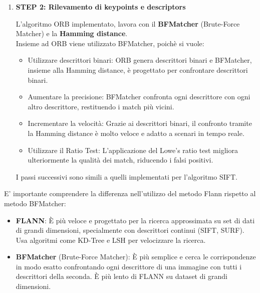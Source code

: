\documentclass[12pt,a4paper,openright,twoside]{book}
\begin{document}
\begin{enumerate}
\begin{enumerate}
{\itshape orb = cv2.ORB\_create()}\\

\item \textbf{STEP 2: Rilevamento di keypoints e descriptors}

\begin{figure}[H]
    \centering
    
\end{figure}

L'algoritmo ORB implementato, lavora con il \textbf{BFMatcher} (Brute-Force Matcher) e la \textbf{Hamming distance}.\\
Insieme ad ORB viene utilizzato BFMatcher, poichè si vuole:
\begin{itemize}
\item Utilizzare descrittori binari: ORB genera descrittori binari e BFMatcher, insieme alla Hamming distance, è progettato per confrontare descrittori binari.
\item Aumentare la precisione: BFMatcher confronta ogni descrittore con ogni altro descrittore, restituendo i match più vicini.
\item Incrementare la velocità: Grazie ai descrittori binari, il confronto tramite la Hamming distance è molto veloce e adatto a scenari in tempo reale.
\item Utilizzare il Ratio Test: L'applicazione del Lowe's ratio test migliora ulteriormente la qualità dei match, riducendo i falsi positivi.
\end{itemize}

I passi successivi sono simili a quelli implementati per l'algoritmo SIFT.
\end{enumerate}

\end{enumerate}
E' importante comprendere la differenza nell'utilizzo del metodo Flann rispetto al metodo BFMatcher:
\begin{itemize}

\item \textbf{FLANN}: È più veloce e progettato per la ricerca approssimata su set di dati di grandi dimensioni, specialmente con descrittori continui (SIFT, SURF). Usa algoritmi come KD-Tree e LSH per velocizzare la ricerca.
\item \textbf{BFMatcher} (Brute-Force Matcher): È più semplice e cerca le corrispondenze in modo esatto confrontando ogni descrittore di una immagine con tutti i descrittori della seconda. È più lento di FLANN su dataset di grandi dimensioni.

\end{itemize}
\end{document}
